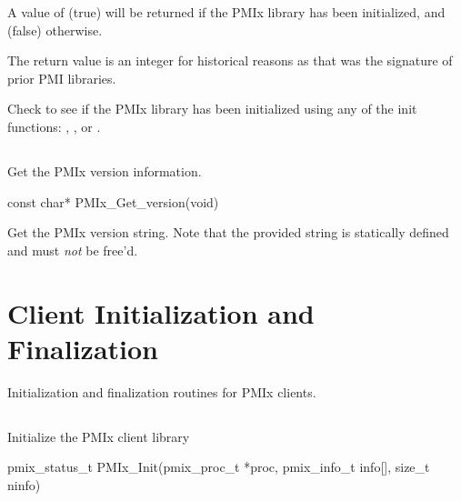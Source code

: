 A value of  (true) will be returned if the \ac{PMIx} library has been initialized, and  (false) otherwise.

\rationalestart
The return value is an integer for historical reasons as that was the signature of prior PMI libraries.
\rationaleend

\descr

Check to see if the \ac{PMIx} library has been initialized using any of the init functions:
, , or .

\subsection{}

\summary

Get the \ac{PMIx} version information.

\format

\cspecificstart
\begin{codepar}
const char* PMIx_Get_version(void)
\end{codepar}
\cspecificend

\descr

Get the \ac{PMIx} version string.
Note that the provided string is statically defined and must \textit{not} be free'd.

\section{Client Initialization and Finalization}
\label{chap:api_init:client}

Initialization and finalization routines for \ac{PMIx} clients.

\subsection{}

\summary

Initialize the \ac{PMIx} client library

\format

\cspecificstart
\begin{codepar}
pmix_status_t
PMIx_Init(pmix_proc_t *proc,
          pmix_info_t info[], size_t ninfo)
\end{codepar}
\cspecificend

